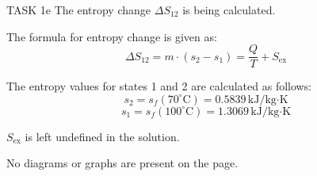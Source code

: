 TASK 1e  
The entropy change \( \Delta S_{12} \) is being calculated.  

The formula for entropy change is given as:  
\[
\Delta S_{12} = m \cdot (s_2 - s_1) = \frac{Q}{T} + S_{\text{ex}}
\]  

The entropy values for states 1 and 2 are calculated as follows:  
\[
s_2 = s_f(70^\circ\text{C}) = 0.5839 \, \text{kJ/kg·K}
\]  
\[
s_1 = s_f(100^\circ\text{C}) = 1.3069 \, \text{kJ/kg·K}
\]  

\( S_{\text{ex}} \) is left undefined in the solution.  

No diagrams or graphs are present on the page.
